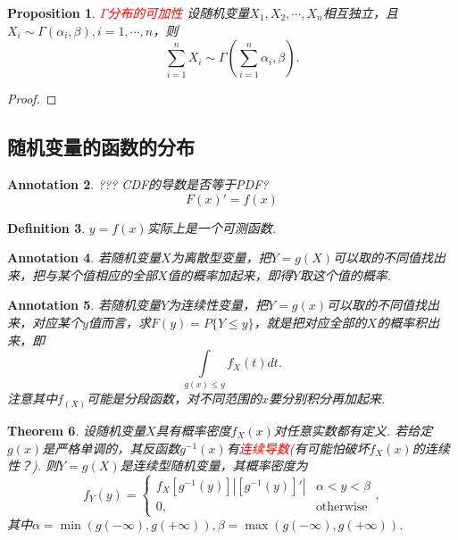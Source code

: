 \documentclass{article}
\newtheorem{theorem}{Theorem}[section]
\newtheorem{proposition}[theorem]{Proposition}
\newtheorem{definition}[theorem]{Definition}
\newtheorem{annotation}[theorem]{Annotation}
\newcommand{\redt}[1]{\textcolor{red}{#1}}
\begin{document}
\begin{proposition}\label{gamma-distribution-additivity}
\rm \redt{$\Gamma$分布的可加性} 设随机变量$X_1,X_2,\cdots,X_n$相互独立，且$X_i \sim \Gamma(\alpha_i,\beta),i=1,\cdots,n$，则
$$
\sum\limits_{i=1}^n X_i \sim \Gamma(\sum\limits_{i=1}^n \alpha_i,\beta).
$$
\end{proposition}

\begin{proof}

\end{proof}

\subsection{随机变量的函数的分布}
\begin{annotation}
\rm ??? CDF的导数是否等于PDF?
$$
F(x)' = f(x)
$$
\end{annotation}

\begin{definition}
\rm $y=f(x)$实际上是一个可测函数. 
\end{definition}

\begin{annotation}
\rm 若随机变量$X$为离散型变量，把$Y=g(X)$可以取的不同值找出来，把与某个值相应的全部$X$值的概率加起来，即得$Y$取这个值的概率.
\end{annotation}

\begin{annotation}
\rm 若随机变量$Y$为连续性变量，把$Y=g(x)$可以取的不同值找出来，对应某个$y$值而言，求$F(y) = P\{Y \leq y\}$，就是把对应全部的$X$的概率积出来，即
$$
\int\limits_{g(x) \leq y} f_X(t)dt.
$$
注意其中$f_(X)$可能是分段函数，对不同范围的$x$要分别积分再加起来. 
\end{annotation}

\begin{theorem}
\rm 设随机变量$X$具有概率密度$f_X(x)$对任意实数都有定义. 若给定$g(x)$是严格单调的，其反函数$g^{-1}(x)$有\redt{连续导数}(有可能怕破坏$f_X(x)$的连续性？). 则$Y = g(X)$是连续型随机变量，其概率密度为
$$
f_Y(y) = \left\{ \begin{array}{ll}
f_X\left[ g^{-1}(y) \right]|\left[g^{-1}(y)\right]'| & \alpha < y < \beta \\
0 , & \text{otherwise}
\end{array}\right. ,
$$
其中$\alpha = \min(g(-\infty), g(+\infty)),\beta = \max(g(-\infty), g(+\infty))$. 
\end{theorem}
\end{document}
